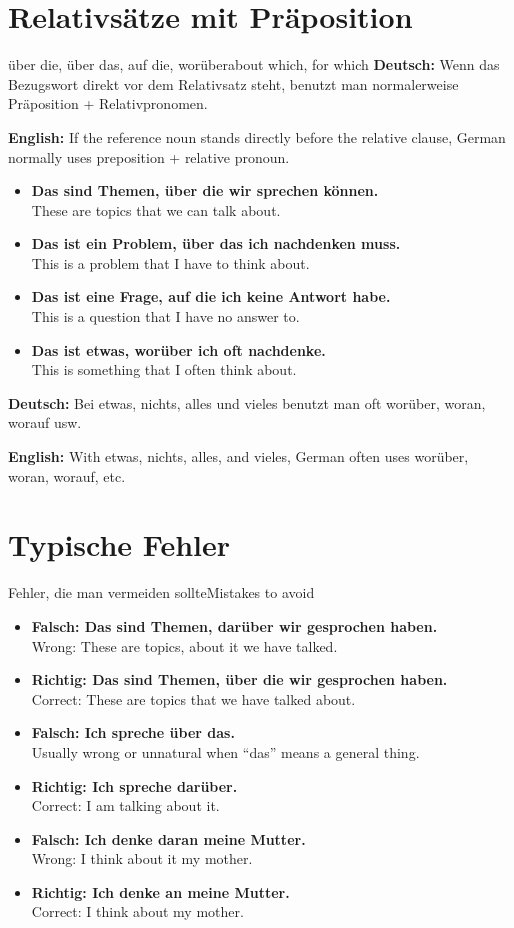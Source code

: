\documentclass[a4paper,11pt]{article}
\newcommand{\GermanText}[1]{\textbf{Deutsch: }#1\par}
\newcommand{\EnglishText}[1]{{\small\color{SoftGray}\textbf{English: }#1\par}}
\newcommand{\ExampleItem}[2]{\item \textbf{#1}\\{\small\color{SoftGray}#2}}
\begin{document}
    
    \section{Relativsätze mit Präposition}
        
        \begin{grammarentry}{über die, über das, auf die, worüber}{about which, for which}
            \GermanText{Wenn das Bezugswort direkt vor dem Relativsatz steht, benutzt man normalerweise Präposition + Relativpronomen.}
            \EnglishText{If the reference noun stands directly before the relative clause, German normally uses preposition + relative pronoun.}
            
            \begin{exbox}
                \begin{itemize}
                    \ExampleItem{Das sind Themen, über die wir sprechen können.}{These are topics that we can talk about.}
                    \ExampleItem{Das ist ein Problem, über das ich nachdenken muss.}{This is a problem that I have to think about.}
                    \ExampleItem{Das ist eine Frage, auf die ich keine Antwort habe.}{This is a question that I have no answer to.}
                    \ExampleItem{Das ist etwas, worüber ich oft nachdenke.}{This is something that I often think about.}
                \end{itemize}
            \end{exbox}
            
            \GermanText{Bei etwas, nichts, alles und vieles benutzt man oft worüber, woran, worauf usw.}
            \EnglishText{With etwas, nichts, alles, and vieles, German often uses worüber, woran, worauf, etc.}
        \end{grammarentry}
    
    
    \section{Typische Fehler}
        
        \begin{grammarentry}{Fehler, die man vermeiden sollte}{Mistakes to avoid}
            \begin{exbox}
                \begin{itemize}
                    \ExampleItem{Falsch: Das sind Themen, darüber wir gesprochen haben.}{Wrong: These are topics, about it we have talked.}
                    \ExampleItem{Richtig: Das sind Themen, über die wir gesprochen haben.}{Correct: These are topics that we have talked about.}
                    \ExampleItem{Falsch: Ich spreche über das.}{Usually wrong or unnatural when ``das'' means a general thing.}
                    \ExampleItem{Richtig: Ich spreche darüber.}{Correct: I am talking about it.}
                    \ExampleItem{Falsch: Ich denke daran meine Mutter.}{Wrong: I think about it my mother.}
                    \ExampleItem{Richtig: Ich denke an meine Mutter.}{Correct: I think about my mother.}
                \end{itemize}
            \end{exbox}
        \end{grammarentry}
    
\end{document}
